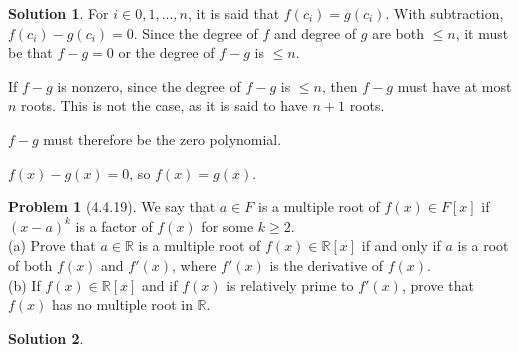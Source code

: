 \documentclass[12pt]{article}
\theoremstyle{definition}
\newtheorem*{prob}{Problem}
\newtheorem*{soln}{Solution}
\newcommand{\RR}{{\mathbb{R}}}
\begin{document}
\begin{soln}

For $i\in0,1,...,n$, it is said that $f(c_i)=g(c_i)$.
With subtraction, $f(c_i)-g(c_i)=0$.
Since the degree of $f$ and degree of $g$ are both $\leq n$,
it must be that $f-g=0$ or the degree of $f-g$ is $\leq n$.

If $f-g$ is nonzero,
since the degree of $f-g$ is $\leq n$,
then $f-g$ must have at most $n$ roots.
This is not the case, as it is said to have $n+1$ roots.

$f-g$ must therefore be the zero polynomial.

$f(x)-g(x)=0$, so $f(x)=g(x)$.

\end{soln}

\begin{prob}[4.4.19]
We say that $a \in F$ is a multiple root of  $f(x) \in F[x]$ if  
$(x - a)^k$ is a factor of  $f(x)$ for some $k \geq 2$. \\
(a)   Prove that $a \in \RR$ is a multiple root of  $f(x)\in \RR[x]$ 
if and only if  $a$ is a root of both $f(x)$ and $f'(x)$, where $f'(x)$ 
is the derivative of  $f(x)$.\\
(b)   If  $f(x) \in  \RR[x]$ and if $f(x)$ is relatively prime to $f'(x)$,
 prove that $f(x)$ has no multiple root in $\RR$.
\end{prob}

\begin{soln}

\end{soln}
\end{document}
